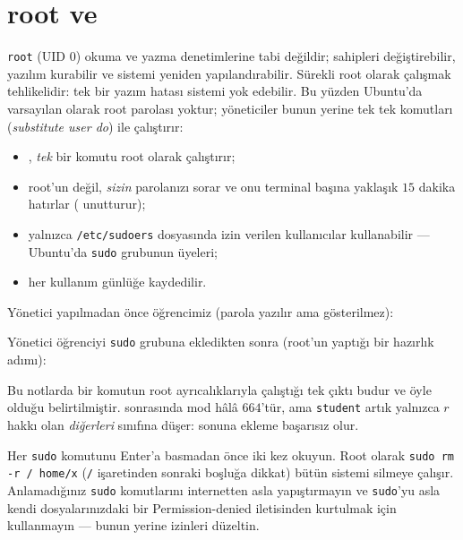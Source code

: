\section{root ve }

\texttt{root} (UID $0$) okuma ve yazma denetimlerine tabi değildir; sahipleri değiştirebilir, yazılım kurabilir ve sistemi yeniden yapılandırabilir. Sürekli root olarak çalışmak tehlikelidir: tek bir yazım hatası sistemi yok edebilir. Bu yüzden Ubuntu'da varsayılan olarak root parolası yoktur; yöneticiler bunun yerine tek tek komutları  (\emph{substitute user do}) ile çalıştırır:
\begin{itemize}
  \item {}, \emph{tek} bir komutu root olarak çalıştırır;
  \item root'un değil, \emph{sizin} parolanızı sorar ve onu terminal başına yaklaşık $15$ dakika hatırlar ( unutturur);
  \item yalnızca \texttt{/etc/sudoers} dosyasında izin verilen kullanıcılar kullanabilir --- Ubuntu'da \texttt{sudo} grubunun üyeleri;
  \item her kullanım günlüğe kaydedilir.
\end{itemize}

Yönetici yapılmadan önce öğrencimiz (parola yazılır ama gösterilmez):



Yönetici öğrenciyi \texttt{sudo} grubuna ekledikten sonra (root'un yaptığı bir hazırlık adımı):



Bu notlarda bir komutun root ayrıcalıklarıyla çalıştığı tek çıktı budur ve öyle olduğu belirtilmiştir.  sonrasında mod hâlâ $664$'tür, ama \texttt{student} artık yalnızca $r$ hakkı olan \emph{diğerleri} sınıfına düşer: sonuna ekleme başarısız olur.

\begin{keyidea}
Her \texttt{sudo} komutunu Enter'a basmadan önce iki kez okuyun. Root olarak \texttt{sudo rm -r / home/x} (\texttt{/} işaretinden sonraki boşluğa dikkat) bütün sistemi silmeye çalışır. Anlamadığınız \texttt{sudo} komutlarını internetten asla yapıştırmayın ve \texttt{sudo}'yu asla kendi dosyalarınızdaki bir Permission-denied iletisinden kurtulmak için kullanmayın --- bunun yerine izinleri düzeltin.
\end{keyidea}

